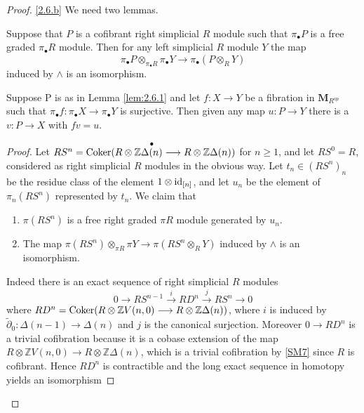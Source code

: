 \documentclass[../main]{subfiles}
\begin{document}
\begin{proof}
\ref{2.6.b} We need two lemmas.
\begin{lemma}\label{lem:2.6.1}
    Suppose that $P$ is a cofibrant right simplicial $R$ module such that $\pi_\bullet P$ is a free graded $\pi_\bullet R$ module. Then for any left simplicial $R$ module $Y$ the map
    \[\pi_\bullet P \otimes_{\pi_\bullet R} \pi_\bullet Y\longrightarrow \pi_\bullet (P\otimes_R Y)\]
    induced by $\wedge$ is an isomorphism.
\end{lemma}
\begin{lemma}\label{lem:2.6.2}
    Suppose P is as in Lemma \ref{lem:2.6.1} and let $f:X\longrightarrow Y$ be a fibration in $\mathbf{M}_{R^{op}}$ such that $\pi_\bullet f:\pi_\bullet X\longrightarrow \pi_\bullet Y$ is surjective. Then given any map $u:P\longrightarrow Y$ there is a $v:P\longrightarrow X$ with $fv=u$.
\end{lemma}
\begin{proof}
Let $RS^n = \operatorname{Coker}(R\otimes \mathbb{Z}\overset{\bullet}{\Delta(n)} \longrightarrow R\otimes\mathbb{Z}\Delta(n))$ for $n\geq 1$, and let $RS^0=R$, considered as right simplicial $R$ modules in the obvious way. Let $t_n\in (RS^n)_n$ be the residue class of the element $1\otimes \operatorname{id}_{[n]}$, and let $u_n$ be the element of $\pi_n(RS^n)$ represented by $t_n$. We claim that
\begin{enumerate}[label = \Alph*.]
    \item $\pi(RS^n)$ is a free right graded $\pi R$ module generated by $u_n$.
    \item The map $\pi(RS^n)\otimes_{\pi R}\pi Y\longrightarrow \pi(RS^n\otimes_R Y)$ induced by $\wedge$ is an isomorphism.
\end{enumerate}
Indeed there is an exact sequence of right simplicial $R$ modules
\begin{equation}\label{eq:2.6.11}\tag{11}
    0 \longrightarrow  RS^{n-1} \overset{i}{\longrightarrow } RD^{n} \overset{j}{\longrightarrow } RS^{n} \longrightarrow  0
\end{equation}
where $RD^{n} = \operatorname{Coker} (R \otimes \mathbb{Z} V (n, 0) \longrightarrow  R \otimes \mathbb{Z} \Delta (n))$, where $i$ is induced by $\tilde{\partial}_0 \colon \Delta (n-1) \longrightarrow  \Delta (n)$ and $j$ is the canonical surjection. Moreover $0 \longrightarrow  RD^{n}$ is a trivial cofibration because it is a cobase extension of the map \\$R \otimes \mathbb{Z} V(n, 0) \longrightarrow  R \otimes \mathbb{Z} \Delta (n)$, which is a trivial cofibration by \ref{SM7} since $R$ is cofibrant. Hence $RD^{n}$ is contractible and the long exact sequence in homotopy yields an isomorphism

\end{proof}
\end{proof}
\end{document}
